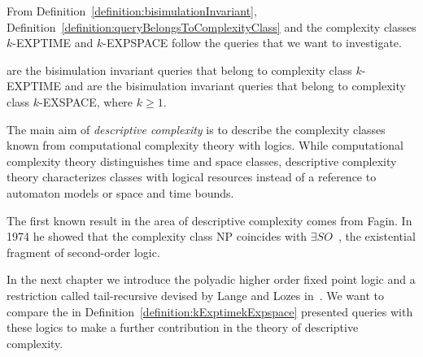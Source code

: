 From Definition~\ref{definition:bisimulationInvariant}, Definition~\ref{definition:queryBelongsToComplexityClass}
and the complexity classes $k$-EXPTIME and $k$-EXPSPACE follow the queries that we want to investigate.

\begin{definition}
    \label{definition:kExptimekExpspace}
     are the bisimulation invariant queries that belong to complexity class $k$-EXPTIME and
     are the bisimulation invariant queries that belong to complexity class $k$-EXSPACE, where $k \geq 1$.
\end{definition}

The main aim of \emph{descriptive complexity} is to describe the complexity classes known from
computational complexity theory with logics. While computational complexity theory distinguishes time and space
classes, descriptive complexity theory characterizes classes with logical resources instead of a reference to
automaton models or space and time bounds.

The first known result in the area of descriptive complexity comes from Fagin. In 1974 he showed that the complexity
class NP coincides with $\exists SO$~\cite{fagin1974generalized}, the existential fragment of second-order logic.

In the next chapter we introduce the polyadic higher order fixed point logic and a restriction called tail-recursive
devised by Lange and Lozes in~\cite{lange2014capturing}. We want to compare the in
Definition~\ref{definition:kExptimekExpspace} presented queries with these logics to make a further contribution in
the theory of descriptive complexity.